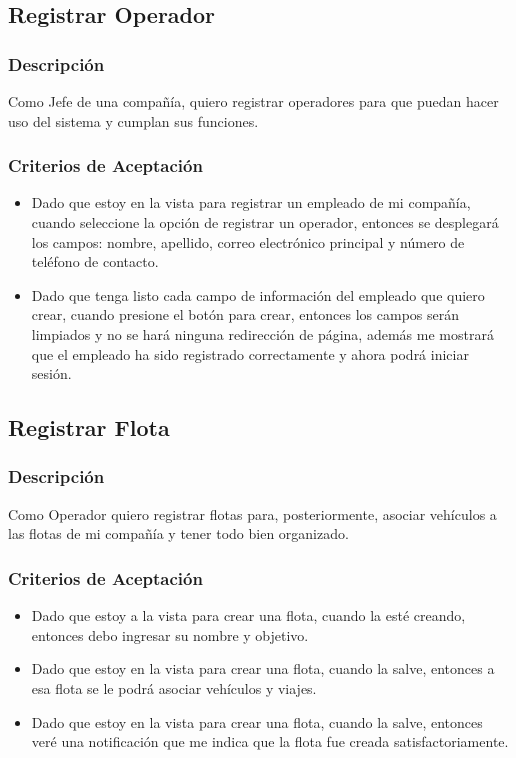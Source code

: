 \documentclass{article}
\begin{document}
\subsection{Registrar Operador}
\subsubsection{Descripción}
Como Jefe de una compañía, quiero registrar operadores para que puedan hacer uso del sistema y cumplan sus funciones.
\subsubsection{Criterios de Aceptación}
\begin{itemize}
    \item Dado que estoy en la vista para registrar un empleado de mi compañía, cuando seleccione la opción de registrar un operador, entonces se desplegará los campos: nombre, apellido, correo electrónico principal y número de teléfono de contacto.
    \item Dado que tenga listo cada campo de información del empleado que quiero crear, cuando presione el botón para crear, entonces los campos serán limpiados y no se hará ninguna redirección de página, además me mostrará que el empleado ha sido registrado correctamente y ahora podrá iniciar sesión.
\end{itemize}

\subsection{Registrar Flota}
\subsubsection{Descripción}
Como Operador quiero registrar flotas para, posteriormente, asociar vehículos a las flotas de mi compañía y tener todo bien organizado.
\subsubsection{Criterios de Aceptación}
\begin{itemize}
    \item Dado que estoy a la vista para crear una flota, cuando la esté creando, entonces debo ingresar su nombre y objetivo.
    \item Dado que estoy en la vista para crear una flota, cuando la salve, entonces a esa flota se le podrá asociar vehículos y viajes.
    \item Dado que estoy en la vista para crear una flota, cuando la salve, entonces veré una notificación que me indica que la flota fue creada satisfactoriamente.
\end{itemize}
\end{document}
